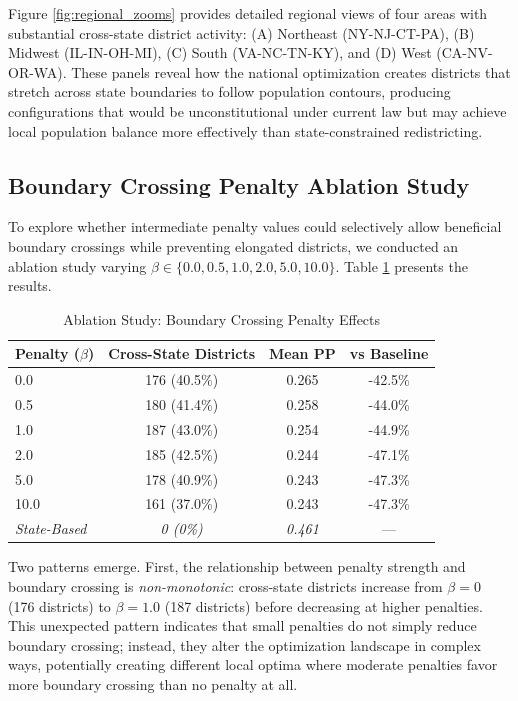 Figure \ref{fig:regional_zooms} provides detailed regional views of four areas with substantial cross-state district activity: (A) Northeast (NY-NJ-CT-PA), (B) Midwest (IL-IN-OH-MI), (C) South (VA-NC-TN-KY), and (D) West (CA-NV-OR-WA). These panels reveal how the national optimization creates districts that stretch across state boundaries to follow population contours, producing configurations that would be unconstitutional under current law but may achieve local population balance more effectively than state-constrained redistricting.

\subsection{Boundary Crossing Penalty Ablation Study}

To explore whether intermediate penalty values could selectively allow beneficial boundary crossings while preventing elongated districts, we conducted an ablation study varying $ \beta \in \{0.0, 0.5, 1.0, 2.0, 5.0, 10.0\} $. Table \ref{tab:ablation} presents the results.

\begin{table}[h]
\centering
\caption{Ablation Study: Boundary Crossing Penalty Effects}
\label{tab:ablation}
\begin{tabular}{lccc}
\toprule
\textbf{Penalty ($\beta$)} & \textbf{Cross-State Districts} & \textbf{Mean PP} & \textbf{vs Baseline} \\
\midrule
0.0 & 176 (40.5\%) & 0.265 & -42.5\% \\
0.5 & 180 (41.4\%) & 0.258 & -44.0\% \\
1.0 & 187 (43.0\%) & 0.254 & -44.9\% \\
2.0 & 185 (42.5\%) & 0.244 & -47.1\% \\
5.0 & 178 (40.9\%) & 0.243 & -47.3\% \\
10.0 & 161 (37.0\%) & 0.243 & -47.3\% \\
\midrule
\textit{State-Based} & \textit{0 (0\%)} & \textit{0.461} & --- \\
\bottomrule
\end{tabular}
\end{table}

Two patterns emerge. First, the relationship between penalty strength and boundary crossing is \textit{non-monotonic}: cross-state districts increase from $ \beta = 0 $ (176 districts) to $ \beta = 1.0 $ (187 districts) before decreasing at higher penalties. This unexpected pattern indicates that small penalties do not simply reduce boundary crossing; instead, they alter the optimization landscape in complex ways, potentially creating different local optima where moderate penalties favor more boundary crossing than no penalty at all.

